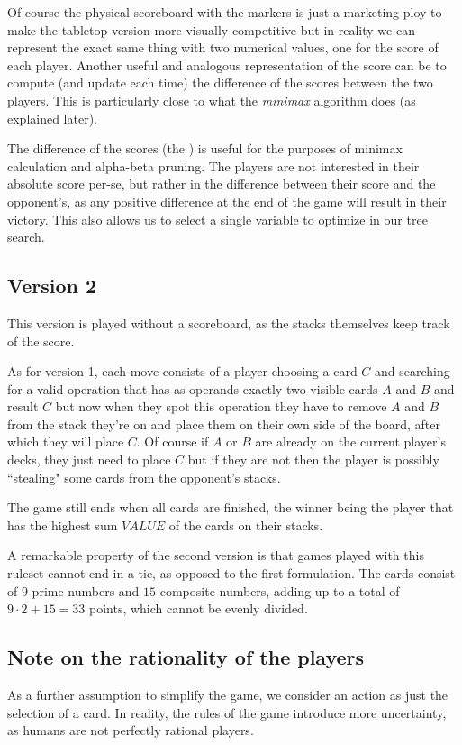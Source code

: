 \documentclass[conference]{IEEEtran}
\begin{document}
Of course the physical scoreboard with the markers is just a marketing ploy to make the tabletop version more visually competitive but in reality we can represent the exact same thing with two numerical values, one for the score of each player. Another useful and analogous representation of the score can be to compute (and update each time) the difference of the scores between the two players. This is particularly close to what the \textit{minimax} algorithm does (as explained later).

The difference of the scores (the ) is useful for the purposes of minimax calculation and alpha-beta pruning. The players are not interested in their absolute score per-se, but rather in the difference between their score and the opponent's, as any positive difference at the end of the game will result in their victory. This also allows us to select a single variable to optimize in our tree search.

\subsection{Version 2}
This version is played without a scoreboard, as the stacks themselves keep track of the score. 

As for version 1, each move consists of a player choosing a card $C$ and searching for a valid operation that has as operands exactly two visible cards $A$ and $B$ and result $C$ but now when they spot this operation they have to remove $A$ and $B$ from the stack they're on and place them on their own side of the board, after which they will place $C$. Of course if $A$ or $B$ are already on the current player's decks, they just need to place $C$ but if they are not then the player is possibly ``stealing" some cards from the opponent's stacks. 

The game still ends when all cards are finished, the winner being the player that has the highest sum $VALUE$ of the cards on their stacks.

A remarkable property of the second version is that games played with this ruleset cannot end in a tie, as opposed to the first formulation. The cards consist of $9$ prime numbers and $15$ composite numbers, adding up to a total of \(9\cdot2+15=33\) points, which cannot be evenly divided.

\subsection{Note on the rationality of the players}
As a further assumption to simplify the game, we consider an action as just the selection of a card. In reality, the rules of the game introduce more uncertainty, as humans are not perfectly rational players. 
\end{document}

